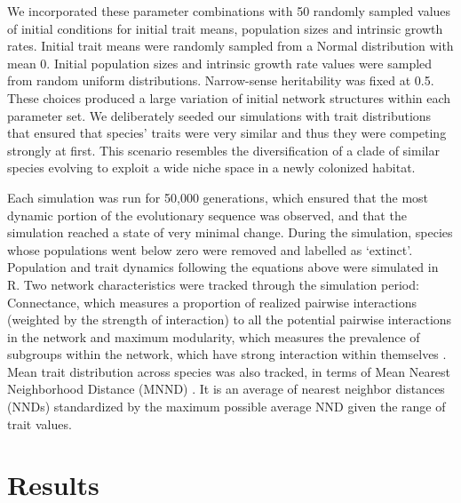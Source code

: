 \documentclass[12pt]{article}
\begin{document}
We incorporated these parameter combinations with 50 randomly sampled values of initial conditions for initial trait means, population sizes and intrinsic growth rates. Initial trait means were randomly sampled from a Normal distribution with mean 0. Initial population sizes and intrinsic growth rate values were sampled from random uniform distributions. Narrow-sense heritability was fixed at 0.5. These choices produced a large variation of initial network structures within each parameter set. We deliberately seeded our simulations with trait distributions that ensured that species’ traits were very similar and thus they were competing strongly at first. This scenario resembles the diversification of a clade of similar species evolving to exploit a wide niche space in a newly colonized habitat. 

Each simulation was run for 50,000 generations, which ensured that the most dynamic portion of the evolutionary sequence was observed, and that the simulation reached a state of very minimal change. During the simulation, species whose populations went below zero were removed and labelled as ‘extinct’. Population and trait dynamics following the equations above were simulated in R. Two network characteristics were tracked through the simulation period: Connectance, which measures a proportion of realized pairwise interactions (weighted by the strength of interaction) to all the potential pairwise interactions in the network and maximum modularity, which measures the prevalence of subgroups within the network, which have strong interaction within themselves \cite{Newman2014}. Mean trait distribution across species was also tracked, in terms of Mean Nearest Neighborhood Distance (MNND) \cite{Findley1976}. It is an average of nearest neighbor distances (NNDs) standardized by the maximum possible average NND given the range of trait values.

\section{Results}
\end{document}
